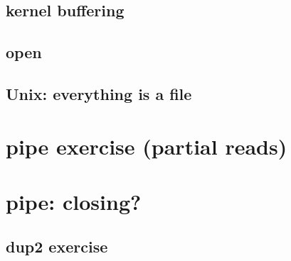 \subsection{kernel buffering}



\subsection{open}


\subsection{Unix: everything is a file}



\section{pipe exercise (partial reads)}

\section{pipe: closing?}


\subsection{dup2 exercise}

